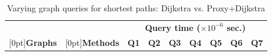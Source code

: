 \begin{table}[t!]
\caption{Varying graph queries for shortest paths: Dijkstra  vs. Proxy+Dijkstra}\label{tab:performance_path_queries_dj}
\vspace{-2ex}
\begin{center}


\begin{tabular}{|c|c||r|r|r|r|r|r|r|}
\hline
  &   & \multicolumn{7}{c|}{\bf Query time ($\times 10^{-6}$ sec.)} \\
\cline{3-9}

\raisebox{1.5ex}[0pt]{\bf Graphs} & \raisebox{1.5ex}[0pt]{\bf Methods} & {\bf Q1} & {\bf Q2} & {\bf Q3} & {\bf Q4} & {\bf Q5} & {\bf Q6} & {\bf Q7}  \\ \hline \hline


\end{tabular}
\end{center}
\end{table}
